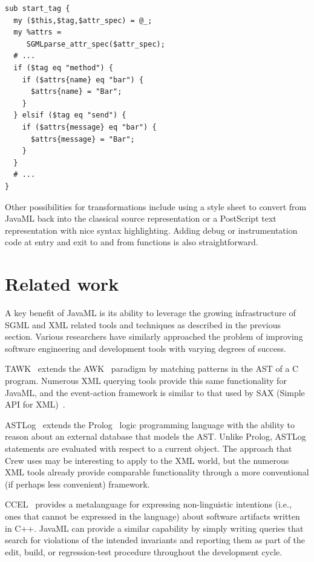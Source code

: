 \documentclass{article}
\begin{document}
\begin{verbatim}
sub start_tag { 
  my ($this,$tag,$attr_spec) = @_;
  my %attrs = 
     SGMLparse_attr_spec($attr_spec);
  # ...
  if ($tag eq "method") {
    if ($attrs{name} eq "bar") {
      $attrs{name} = "Bar";
    }
  } elsif ($tag eq "send") {
    if ($attrs{message} eq "bar") {
      $attrs{message} = "Bar";
    }
  }
  # ...
}
\end{verbatim}

Other possibilities for transformations include using a style sheet to
convert from JavaML back into the classical source representation or a
PostScript text representation with nice syntax highlighting.  Adding
debug or instrumentation code at entry and exit to and from functions is
also straightforward.

\section{Related work}
\label{sec-related}

A key benefit of JavaML is its ability to leverage the growing
infrastructure of SGML and XML related tools and techniques as described
in the previous section.  Various researchers have similarly approached
the problem of improving software engineering and development tools with
varying degrees of success.

TAWK~\cite{TAWK} extends the AWK~\cite{AwkSed} paradigm by matching
patterns in the AST of a C program.  Numerous XML querying tools provide
this same functionality for JavaML, and the event-action framework is
similar to that used by SAX (Simple API for XML)~\cite{SAX}.

ASTLog~\cite{ASTLog} extends the Prolog~\cite{Prolog} logic programming
language with the ability to reason about an external database that
models the AST.  Unlike Prolog, ASTLog statements are evaluated with
respect to a current object.  The approach that Crew uses may be
interesting to apply to the XML world, but the numerous XML tools
already provide comparable functionality through a more conventional (if
perhaps less convenient) framework.

CCEL~\cite{CCEL92} provides a metalanguage for expressing non-linguistic
intentions (i.e., ones that cannot be expressed in the language) about
software artifacts written in C++.  JavaML can provide a similar
capability by simply writing queries that search for violations of the
intended invariants and reporting them as part of the edit, build, or
regression-test procedure throughout the development cycle.
\end{document}
